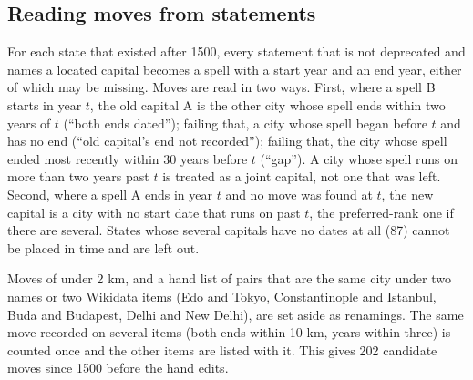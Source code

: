 \documentclass[11pt,a4paper]{article}
\begin{document}
\subsection{Reading moves from statements}
For each state that existed after 1500, every statement that is not deprecated and names a located capital becomes a spell with a start year and an end year, either of which may be missing. Moves are read in two ways. First, where a spell B starts in year $t$, the old capital A is the other city whose spell ends within two years of $t$ (``both ends dated''); failing that, a city whose spell began before $t$ and has no end (``old capital's end not recorded''); failing that, the city whose spell ended most recently within 30 years before $t$ (``gap''). A city whose spell runs on more than two years past $t$ is treated as a joint capital, not one that was left. Second, where a spell A ends in year $t$ and no move was found at $t$, the new capital is a city with no start date that runs on past $t$, the preferred-rank one if there are several. States whose several capitals have no dates at all (87) cannot be placed in time and are left out.

Moves of under 2 km, and a hand list of pairs that are the same city under two names or two Wikidata items (Edo and Tokyo, Constantinople and Istanbul, Buda and Budapest, Delhi and New Delhi), are set aside as renamings. The same move recorded on several items (both ends within 10 km, years within three) is counted once and the other items are listed with it. This gives 202 candidate moves since 1500 before the hand edits.
\end{document}

